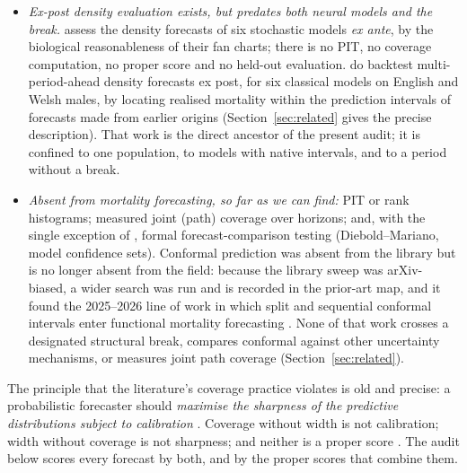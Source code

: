 \begin{itemize}
  33\%''---nominal 95\% Lee--Carter intervals covering a third to a half of
  realisations. The test window (2001--2018, three countries) contains no
  structural break. The most recent competitor, the gradient-boosted
  multi-population model of \citet{miao2025gradient}, repeats the pattern one
  level up: marginal coverages of 90\%, 94\% and 96\% against a nominal 95\%
  are reported and the closest is declared ``the most properly calibrated'',
  again with no proper score and no width penalty alongside.
\item \emph{Ex-post density evaluation exists, but predates both neural
  models and the break.} \citet{cairns2011mortality} assess the density
  forecasts of six stochastic models \emph{ex ante}, by the biological
  reasonableness of their fan charts; there is no PIT, no coverage
  computation, no proper score and no held-out evaluation.
  \citet{dowd2010backtesting} do backtest multi-period-ahead density
  forecasts ex post, for six classical models on English and Welsh males,
  by locating realised mortality within the prediction intervals of
  forecasts made from earlier origins
  (Section~\ref{sec:related} gives the precise description).
  That work is the direct ancestor of the present audit; it is confined to
  one population, to models with native intervals, and to a period without a
  break.
\item \emph{Absent from mortality forecasting, so far as we can find:} PIT or
  rank histograms; measured joint (path) coverage over horizons; and, with
  the single exception of \citet{shang2018model}, formal
  forecast-comparison testing (Diebold--Mariano, model confidence sets).
  Conformal prediction was absent from the library but is no longer absent
  from the field: because the library sweep was arXiv-biased, a wider search
  was run and is recorded in the prior-art map, and it found the 2025--2026
  line of work in which split and sequential conformal intervals enter
  functional mortality forecasting
  \citep{shang2025intervals,shang2026conformal,shang2026subnational}. None
  of that work crosses a designated structural break, compares conformal
  against other uncertainty mechanisms, or measures joint path coverage
  (Section~\ref{sec:related}).
\end{itemize}

The principle that the literature's coverage practice violates is old and
precise: a probabilistic forecaster should \emph{maximise the sharpness of
the predictive distributions subject to calibration}
\citep{gneiting2007probabilistic}. Coverage without width is not
calibration; width without coverage is not sharpness; and neither is a
proper score \citep{gneiting2007strictly}. The audit below scores every
forecast by both, and by the proper scores that combine them.

